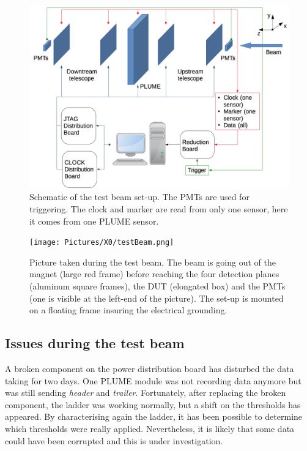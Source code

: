     \begin{figure}[!h]
      \centering
      \includegraphics[width = \textwidth]{Pictures/X0/testBeamAcquisition.png}
      \caption{Schematic of the test beam set-up. The PMTs are used for triggering. The clock and marker are read from only one sensor, here it comes from one PLUME sensor.}
      \label{fig:testBeamAcq}
    \end{figure}

    \begin{figure}
      \centering
      \texttt{[image: Pictures/X0/testBeam.png]}
      \caption{Picture taken during the test beam. The beam is going out of the magnet (large red frame) before reaching the four detection planes (aluminum square frames), the DUT (elongated box) and the PMTs (one is visible at the left-end of the picture). The set-up is mounted on a floating frame insuring the electrical grounding.}
      \label{fig:testBeam}
    \end{figure}

    \subsection{Issues during the test beam}

    A broken component on the power distribution board has disturbed the data taking for two days.
    One \gls{PLUME} module was not recording data anymore but was still sending \textit{header} and \textit{trailer}.
    Fortunately, after replacing the broken component, the ladder was working normally, but a shift on the thresholds has appeared.
    By characterising again the ladder, it has been possible to determine which thresholds were really applied. 
    Nevertheless, it is likely that some data could have been corrupted and this is under investigation.
   
